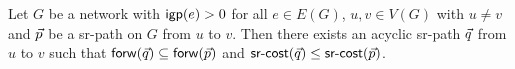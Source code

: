 \begin{theorem}
\label{thm:sracyclic}
Let $G$ be a network with $\mathsf{igp}(e) > 0$ for all $e \in E(G)$, $u, v \in V(G)$ with $u \neq v$ and $\vec{p}$ be a sr-path on $G$ from $u$ to $v$. Then there exists an acyclic sr-path $\vec{q}$ from $u$ to $v$
such that $\mathsf{forw}(\vec{q}) \subseteq \mathsf{forw}(\vec{p})$ and $\textsf{sr-cost}(\vec{q}) \leq \textsf{sr-cost}(\vec{p})$.
\end{theorem}


% 
% 
% 
